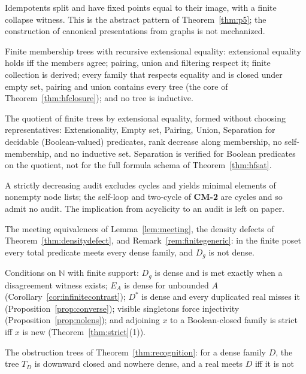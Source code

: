 \begin{description}[leftmargin=1.2em, itemsep=2pt]
\item[\texttt{Packaging}.] Idempotents split and have fixed points equal to their image, with a
finite collapse witness. This is the abstract pattern of Theorem~\ref{thm:p5}; the construction
of canonical presentations from graphs is not mechanized.
\item[\texttt{HFClosure}.] Finite membership trees with recursive extensional equality:
extensional equality holds iff the members agree; pairing, union and filtering respect it;
finite collection is derived; every family that respects equality and is closed under empty set,
pairing and union contains every tree (the core of Theorem~\ref{thm:hfclosure}); and no tree is
inductive.
\item[\texttt{HFSets}.] The quotient of finite trees by extensional equality, formed without
choosing representatives: Extensionality, Empty set, Pairing, Union, Separation for decidable
(Boolean-valued) predicates, rank decrease along membership, no self-membership, and no inductive
set. Separation is verified for Boolean predicates on the quotient, not for the full formula
schema of Theorem~\ref{thm:hfsat}.
\item[\texttt{RankAudit}.] A strictly decreasing audit excludes cycles and yields minimal
elements of nonempty node lists; the self-loop and two-cycle of \textbf{CM-2} are cycles and so
admit no audit. The implication from acyclicity to an audit is left on paper.
\item[\texttt{FiniteCohen}.] The meeting equivalences of Lemma~\ref{lem:meeting}, the density
defects of Theorem~\ref{thm:densitydefect}, and Remark~\ref{rem:finitegeneric}: in the finite poset
every total predicate meets every dense family, and $D_g$ is not dense.
\item[\texttt{CohenBoundary}.] Conditions on $\mathbb N$ with finite support: $D_g$ is dense and is
met exactly when a disagreement witness exists; $E_A$ is dense for unbounded $A$
(Corollary~\ref{cor:infinitecontrast}); $D^\ast$ is dense and every duplicated real misses it
(Proposition~\ref{prop:converse}); visible singletons force injectivity
(Proposition~\ref{prop:nolens}); and adjoining $x$ to a Boolean-closed family is strict iff $x$ is
new (Theorem~\ref{thm:strict}(1)).
\item[\texttt{CohenRecognition}.] The obstruction trees of Theorem~\ref{thm:recognition}: for a dense
family $D$, the tree $T_D$ is downward closed and nowhere dense, and a real meets $D$ iff it is not

\end{description}

